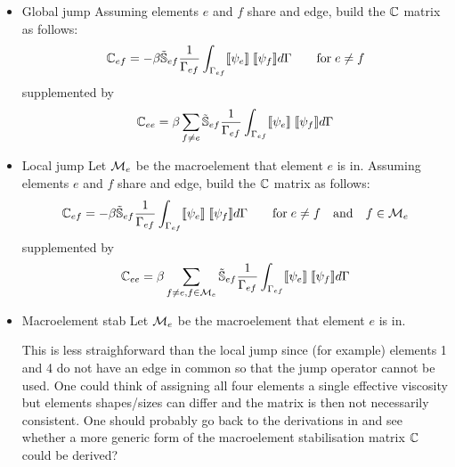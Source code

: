 \begin{itemize}
\item{Global jump} Assuming elements $e$ and $f$ share and edge, build the ${\mathbb{C}}$ matrix as follows:
\begin{equation}
{\mathbb{C}}_{ef} = -\beta \tilde{{\mathbb{S}}}_{ef}  
\frac{1}{\Gamma_{ef}} \int_{\Gamma_{ef}} \llbracket \psi_e \rrbracket \; \llbracket \psi_f \rrbracket d\Gamma
\qquad
\text{for} \; e\ne f
\end{equation}
supplemented by
\[
{\mathbb{C}}_{ee} =  \beta 
\sum_{f\ne e} \tilde{{\mathbb{S}}}_{ef}\frac{1}{\Gamma_{ef}} \int_{\Gamma_{ef}} \llbracket \psi_e \rrbracket \; \llbracket \psi_f \rrbracket d\Gamma
\]

\item{Local jump}  Let ${\cal M}_e$ be the macroelement that element $e$ is in. Assuming elements $e$ and $f$ share and edge, build the ${\mathbb{C}}$ matrix as follows:
\begin{equation}
{\mathbb{C}}_{ef} = -\beta \tilde{{\mathbb{S}}}_{ef}  
\frac{1}{\Gamma_{ef}} \int_{\Gamma_{ef}} \llbracket \psi_e \rrbracket \; \llbracket \psi_f \rrbracket d\Gamma
\qquad
\text{for} \; e\ne f \quad \text{and} \quad f\in {\cal M}_e
\end{equation}
supplemented by
\[
{\mathbb{C}}_{ee} =  \beta 
\sum_{f\ne e, f\in {\cal M}_e} \tilde{{\mathbb{S}}}_{ef}\frac{1}{\Gamma_{ef}} \int_{\Gamma_{ef}} \llbracket \psi_e \rrbracket \; \llbracket \psi_f \rrbracket d\Gamma
\]



\item{Macroelement stab} 
Let ${\cal M}_e$ be the macroelement that element $e$ is in. 
\begin{center}

\end{center}

This is less straighforward than the local jump since 
(for example) elements 1 and 4 do not have an edge in common so that the jump operator cannot be used. 
One could think of assigning all four elements a single effective viscosity but elements shapes/sizes can differ and the matrix is then not necessarily consistent. 
One should probably go back to the derivations in 
\textcite{elsw} and see whether a more generic form of the macroelement stabilisation matrix ${\mathbb{C}}$ could be derived?

\end{itemize}


